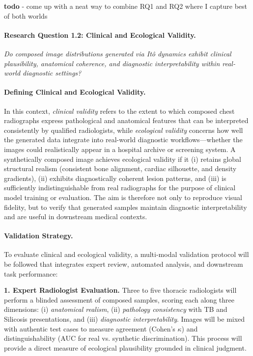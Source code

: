\textbf{todo} - come up with a neat way to combine RQ1 and RQ2 where I capture best of both worlds
\paragraph{Research Question 1.2: Clinical and Ecological Validity.}
\emph{Do composed image distributions generated via Itô dynamics exhibit clinical plausibility, anatomical coherence, and diagnostic interpretability within real-world diagnostic settings?}

\paragraph{Defining Clinical and Ecological Validity.}
In this context, \emph{clinical validity} refers to the extent to which composed chest radiographs express pathological and anatomical features that can be interpreted consistently by qualified radiologists, while \emph{ecological validity} concerns how well the generated data integrate into real-world diagnostic workflows—whether the images could realistically appear in a hospital archive or screening system.  
A synthetically composed image achieves ecological validity if it (i) retains global structural realism (consistent bone alignment, cardiac silhouette, and density gradients), (ii) exhibits diagnostically coherent lesion patterns, and (iii) is sufficiently indistinguishable from real radiographs for the purpose of clinical model training or evaluation.  
The aim is therefore not only to reproduce visual fidelity, but to verify that generated samples maintain diagnostic interpretability and are useful in downstream medical contexts.

\paragraph{Validation Strategy.}
To evaluate clinical and ecological validity, a multi-modal validation protocol will be followed that integrates expert review, automated analysis, and downstream task performance:

\textbf{1. Expert Radiologist Evaluation.}  
Three to five thoracic radiologists will perform a blinded assessment of composed samples, scoring each along three dimensions: (i) \emph{anatomical realism}, (ii) \emph{pathology consistency} with TB and Silicosis presentations, and (iii) \emph{diagnostic interpretability}.  
Images will be mixed with authentic test cases to measure agreement (Cohen’s $\kappa$) and distinguishability (AUC for real vs. synthetic discrimination).  
This process will provide a direct measure of ecological plausibility grounded in clinical judgment.

